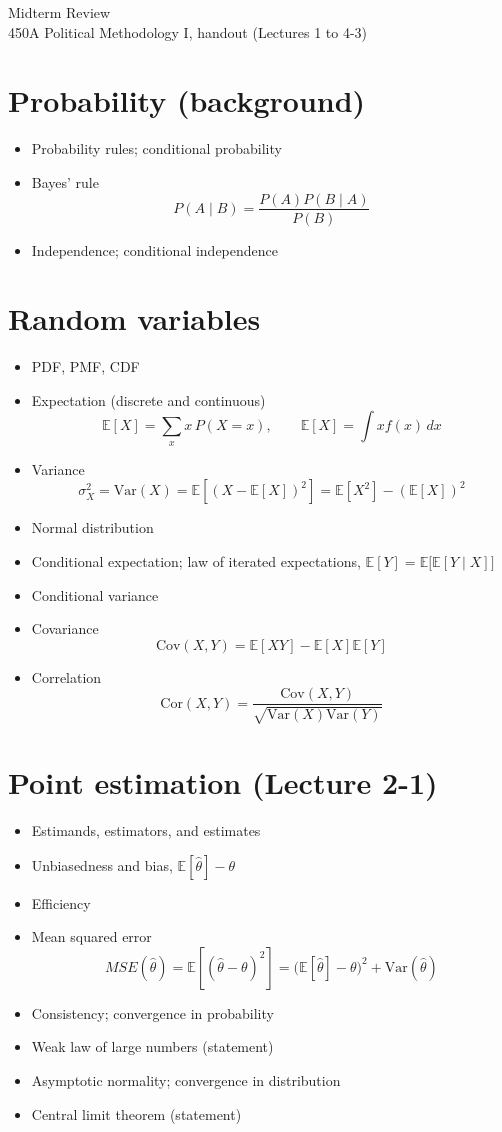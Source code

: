 \documentclass[11pt]{article}
\newcommand\E{\mathbb{E}}
\newcommand\Var{\text{Var}}
\newcommand\Cov{\text{Cov}}
\newcommand\Cor{\text{Cor}}
\begin{document}
\begin{center}
{\LARGE Midterm Review}\\[4pt]
450A Political Methodology I, handout (Lectures 1 to 4-3)
\end{center}

\section{Probability (background)}
\begin{itemize}
\item Probability rules; conditional probability
\item Bayes' rule
\[
P(A\mid B)=\frac{P(A)P(B\mid A)}{P(B)}
\]
\item Independence; conditional independence
\end{itemize}

\section{Random variables}

\begin{itemize}
\item PDF, PMF, CDF
\item Expectation (discrete and continuous)
\[
\E[X]=\sum_{x} x\,P(X=x), \qquad \E[X]=\int x f(x)\,dx
\]
\item Variance
\[
\sigma_X ^2=\Var(X)=\E[(X-\E[X])^2]=\E[X^2]-(\E[X])^2
\]
\item Normal distribution
\item Conditional expectation; law of iterated expectations, $\E[Y]=\E\big[\E[Y\mid X]\big]$
\item Conditional variance
\item Covariance
\[
\Cov(X,Y)=\E[XY]-\E[X]\E[Y]
\]
\item Correlation
\[
\Cor(X,Y)=\frac{\Cov(X,Y)}{\sqrt{\Var(X)\Var(Y)}}
\]
\end{itemize}

\section{Point estimation (Lecture 2-1)}

\begin{itemize}
\item Estimands, estimators, and estimates
\item Unbiasedness and bias, $\E[\hat\theta]-\theta$
\item Efficiency
\item Mean squared error
\[
MSE(\hat \theta)=\E[(\hat\theta-\theta)^2]=\big(\E[\hat \theta]-\theta\big)^2+\Var(\hat \theta)
\]
\item Consistency; convergence in probability
\item Weak law of large numbers (statement)
\item Asymptotic normality; convergence in distribution
\item Central limit theorem (statement)
\end{itemize}
\end{document}
